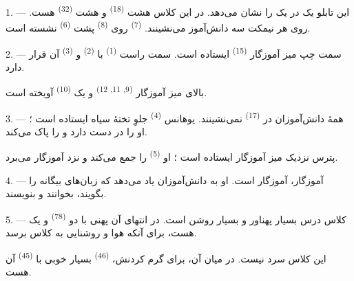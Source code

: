 \VUsaut{2.0mm}
\VUsaut{3.2mm}
\VUsaut{2.6mm}
\VUsaut{3.4mm}
\VUornamento{9pt}
\VUsaut{5.0mm}
\VUsaut{3.0mm}
\VUfilet{16mm}
\VUsaut{5.6mm}

\VUsaut{1.4mm}
\VUsaut{2.2mm}
\VUfilet{20mm}
\VUsaut{6.4mm}

\VUsaut{3.0mm}

1. --- این تابلو یک  در یک  را نشان
می‌دهد. در این کلاس هشت  \textsuperscript{(18)} و هشت
 \textsuperscript{(32)} هست. روی هر نیمکت سه دانش‌آموز
می‌نشینند.  \textsuperscript{(7)} روی 
\textsuperscript{(8)} پشت  \textsuperscript{(6)}
نشسته است.

2. --- سمت چپ میز آموزگار  \textsuperscript{(15)}
 ایستاده است. سمت راست 
\textsuperscript{(1)} با  \textsuperscript{(2)} و
 \textsuperscript{(3)} آن قرار دارد.

بالای میز آموزگار  \textsuperscript{(9, 11,
12)} و یک  \textsuperscript{(10)} آویخته است.

3. --- همهٔ دانش‌آموزان در  \textsuperscript{(17)}
نمی‌نشینند. یوهانس \textsuperscript{(4)} جلوِ تختهٔ سیاه ایستاده است ؛
او  را در دست دارد و  را پاک
می‌کند.

پترس نزدیک میز آموزگار ایستاده است ؛ او 
\textsuperscript{(5)} را جمع می‌کند و نزد آموزگار می‌برد.

4. ---  آموزگار، آموزگار  است. او به
دانش‌آموزان یاد می‌دهد که زبان‌های بیگانه  را بگویند، بخوانند و بنویسند.

5. --- کلاس درس بسیار پهناور و بسیار روشن است. در انتهای آن
 پهنی با دو  \textsuperscript{(78)} و یک
 هست، برای آنکه هوا و روشنایی به کلاس برسد.

این کلاس سرد نیست. در میان آن، برای گرم کردنش، 
\textsuperscript{(46)} بسیار خوبی با  \textsuperscript{(45)}
آن هست.

